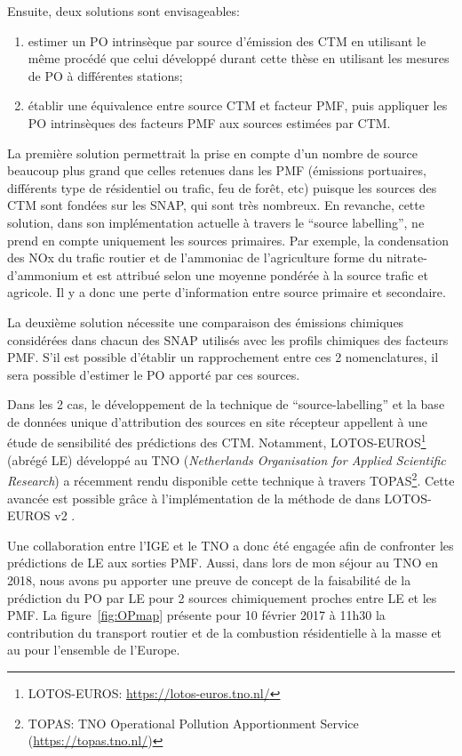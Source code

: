 Ensuite, deux solutions sont envisageables:
\begin{enumerate}
    \item estimer un PO intrinsèque par source d'émission des CTM en utilisant le même
        procédé que celui développé durant cette thèse en utilisant les mesures de PO à
        différentes stations;
    \item établir une équivalence entre source CTM et facteur PMF, puis appliquer les
        PO intrinsèques des facteurs PMF aux sources estimées par CTM.
\end{enumerate}

La première solution permettrait la prise en compte d'un nombre de source beaucoup plus
grand que celles retenues dans les PMF (émissions portuaires, différents type de résidentiel
ou trafic, feu de forêt, etc) puisque les sources des CTM sont fondées sur les SNAP, qui
sont très nombreux.
En revanche, cette solution, dans son implémentation actuelle à travers le ``source
labelling'', ne prend en compte uniquement les sources primaires. Par exemple, la
condensation des NOx du trafic routier et de l'ammoniac de l'agriculture forme du
nitrate-d'ammonium et est attribué selon une moyenne pondérée à la source trafic et
agricole. Il y a donc une perte d'information entre source primaire et secondaire.

La deuxième solution nécessite une comparaison des émissions chimiques considérées dans
chacun des SNAP utilisés avec les profils chimiques des facteurs PMF. S'il est possible
d'établir un rapprochement entre ces 2 nomenclatures, il sera possible d'estimer le PO
apporté par ces sources.

Dans les 2 cas, le développement de la technique de ``source-labelling'' et la base de
données unique d'attribution des sources en site récepteur appellent à une étude de
sensibilité des prédictions des CTM. Notamment, LOTOS-EUROS\footnote{LOTOS-EUROS:
    \url{https://lotos-euros.tno.nl/}} (abrégé LE) développé au TNO (\textit{Netherlands Organisation for
Applied Scientific Research}) a récemment rendu disponible cette technique à travers TOPAS\footnote{TOPAS:
TNO Operational Pollution Apportionment Service (\url{https://topas.tno.nl/})}. Cette
avancée est possible grâce à l'implémentation de la méthode de \cite{kranenburgSource2013} dans
LOTOS-EUROS v2 \autocite{mandersCurriculum2017}.

Une collaboration entre l'IGE et le TNO a donc été engagée afin de confronter les
prédictions de LE aux sorties PMF. Aussi, dans lors de mon séjour au TNO en 2018, nous
avons pu apporter une preuve de concept de la faisabilité de la prédiction du PO par
LE pour 2 sources chimiquement proches entre LE et les PMF.
La figure~\ref{fig:OPmap} présente pour 10 février 2017 à 11h30 la contribution du
transport routier et de la combustion résidentielle à la masse et au \PODTTv{} pour
l'ensemble de l'Europe.

